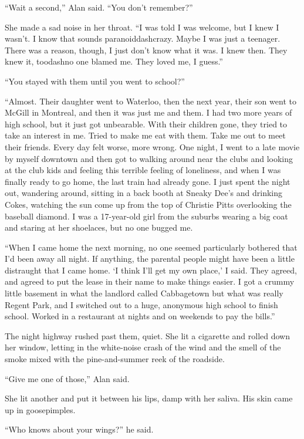 ``Wait a second,'' Alan said.  ``You don't remember?''

She made a sad noise in her throat.  ``I was told I was welcome, but I
knew I wasn't.  I know that sounds paranoiddash{}crazy.  Maybe I was just
a teenager.  There was a reason, though, I just don't know what it
was.  I knew then.  They knew it, toodash{}no one blamed me.  They loved
me, I guess.''

``You stayed with them until you went to school?''

``Almost.  Their daughter went to Waterloo, then the next year, their
son went to McGill in Montreal, and then it was just me and them.  I
had two more years of high school, but it just got unbearable.  With
their children gone, they tried to take an interest in me.  Tried to
make me eat with them.  Take me out to meet their friends.  Every day
felt worse, more wrong.  One night, I went to a late movie by myself
downtown and then got to walking around near the clubs and looking at
the club kids and feeling this terrible feeling of loneliness, and
when I was finally ready to go home, the last train had already gone. 
I just spent the night out, wandering around, sitting in a back booth
at Sneaky Dee's and drinking Cokes, watching the sun come up from the
top of Christie Pitts overlooking the baseball diamond.  I was a
17-year-old girl from the suburbs wearing a big coat and staring at
her shoelaces, but no one bugged me.

``When I came home the next morning, no one seemed particularly
bothered that I'd been away all night.  If anything, the parental
people might have been a little distraught that I came home.  `I think
I'll get my own place,' I said.  They agreed, and agreed to put the
lease in their name to make things easier.  I got a crummy little
basement in what the landlord called Cabbagetown but what was really
Regent Park, and I switched out to a huge, anonymous high school to
finish school.  Worked in a restaurant at nights and on weekends to
pay the bills.''

The night highway rushed past them, quiet.  She lit a cigarette and
rolled down her window, letting in the white-noise crash of the wind
and the smell of the smoke mixed with the pine-and-summer reek of the
roadside.

``Give me one of those,'' Alan said.

She lit another and put it between his lips, damp with her saliva. 
His skin came up in goosepimples.

``Who knows about your wings?'' he said.

